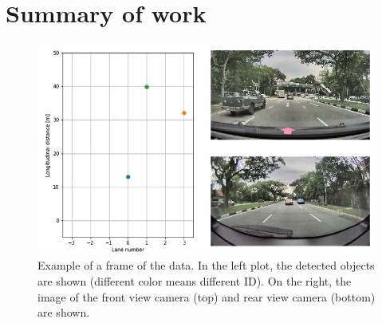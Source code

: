 \documentclass[10pt,final,a4paper,oneside,onecolumn]{article}
\begin{document}
\section{Summary of work}

\begin{figure}
	\centering
	\includegraphics[width=0.8\linewidth]{bmw_example}
	\caption{Example of a frame of the data. In the left plot, the detected objects are shown (different color means different ID). On the right, the image of the front view camera (top) and rear view camera (bottom) are shown.}
	\label{fig:bmw example}
\end{figure}
\end{document}
